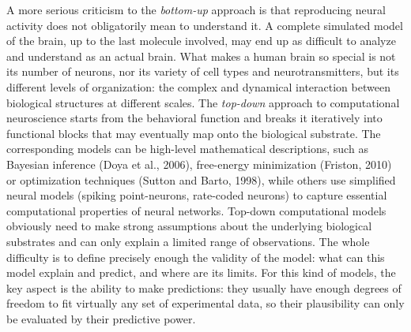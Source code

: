 \documentclass[
  11pt,
  a4paper,
]{scrbook}
\begin{document}
A more serious criticism to the \emph{bottom-up} approach is that
reproducing neural activity does not obligatorily mean to understand it.
A complete simulated model of the brain, up to the last molecule
involved, may end up as difficult to analyze and understand as an actual
brain. What makes a human brain so special is not its number of neurons,
nor its variety of cell types and neurotransmitters, but its different
levels of organization: the complex and dynamical interaction between
biological structures at different scales. The \emph{top-down} approach
to computational neuroscience starts from the behavioral function and
breaks it iteratively into functional blocks that may eventually map
onto the biological substrate. The corresponding models can be
high-level mathematical descriptions, such as Bayesian inference (Doya
et al., 2006), free-energy minimization (Friston, 2010) or optimization
techniques (Sutton and Barto, 1998), while others use simplified neural
models (spiking point-neurons, rate-coded neurons) to capture essential
computational properties of neural networks. Top-down computational
models obviously need to make strong assumptions about the underlying
biological substrates and can only explain a limited range of
observations. The whole difficulty is to define precisely enough the
validity of the model: what can this model explain and predict, and
where are its limits. For this kind of models, the key aspect is the
ability to make predictions: they usually have enough degrees of freedom
to fit virtually any set of experimental data, so their plausibility can
only be evaluated by their predictive power.
\end{document}
